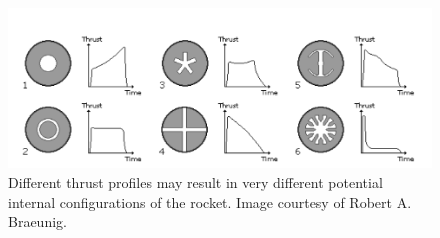 \begin{figure}[h]
    \begin{center}
        \includegraphics[width=0.7\linewidth]{figures/potentialShapes.png}
        \caption{Different thrust profiles may result in very different potential internal configurations of the rocket.
        Image courtesy of Robert A. Braeunig.}
        \label{fig:potentialShapes}
    \end{center}
\end{figure}

